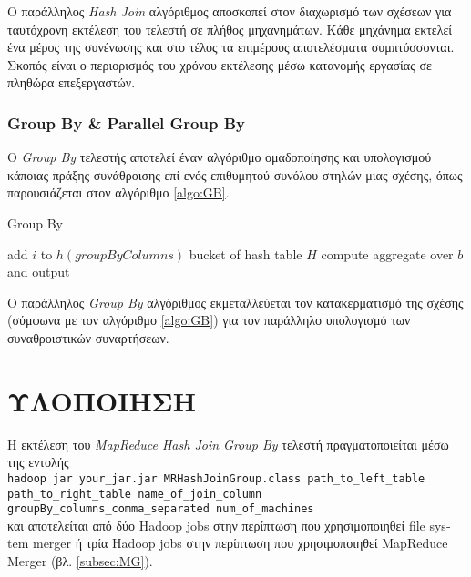 \documentclass{article}
\newcommand{\en}[1]{\foreignlanguage{english}{#1}}
\begin{document}

Ο παράλληλος \emph{\en{Hash Join}} αλγόριθμος αποσκοπεί στον διαχωρισμό των σχέσεων για ταυτόχρονη εκτέλεση του τελεστή σε πλήθος μηχανημάτων. Κάθε μηχάνημα εκτελεί ένα μέρος της συνένωσης και στο τέλος τα επιμέρους αποτελέσματα συμπτύσσονται. Σκοπός είναι ο περιορισμός του χρόνου εκτέλεσης μέσω κατανομής εργασίας σε πληθώρα επεξεργαστών.
 
\subsubsection{\en{Group By \& Parallel Group By}}\label{subsubsec:GroupBy}

Ο \emph{\en{Group By}} τελεστής αποτελεί έναν αλγόριθμο ομαδοποίησης και υπολογισμού κάποιας πράξης συνάθροισης επί ενός επιθυμητού συνόλου στηλών μιας σχέσης, όπως παρουσιάζεται στον αλγόριθμο \ref{algo:GB}.

\begin{algorithm}
\caption{Group By}
\label{algo:GB}
\begin{algorithmic}[1]
\State add $i$ to $h(groupByColumns)$ bucket of hash table $H$
\EndFor
{}
\State compute aggregate over $b$ and output
\EndFor
\EndProcedure
\end{algorithmic}
\end{algorithm}

Ο παράλληλος \emph{\en{Group By}} αλγόριθμος εκμεταλλεύεται τον κατακερματισμό της σχέσης (σύμφωνα με τον αλγόριθμο \ref{algo:GB}) για τον παράλληλο υπολογισμό των συναθροιστικών συναρτήσεων.

\section{ΥΛΟΠΟΙΗΣΗ} \label{sec:Impl}

Η εκτέλεση του \emph{\en{MapReduce Hash Join Group By}} τελεστή πραγματοποιείται μέσω της εντολής \\ \texttt{\en{hadoop jar your\_jar.jar MRHashJoinGroup.class path\_to\_left\_table path\_to\_right\_table
name\_of\_join\_column groupBy\_columns\_comma\_separated num\_of\_machines}}\\
 και αποτελείται από δύο \en{Hadoop jobs} στην περίπτωση που χρησιμοποιηθεί \en{file system merger} ή τρία \en{Hadoop jobs} στην περίπτωση που χρησιμοποιηθεί \en{MapReduce Merger} (βλ. \ref{subsec:MG}).
 
\end{document}
